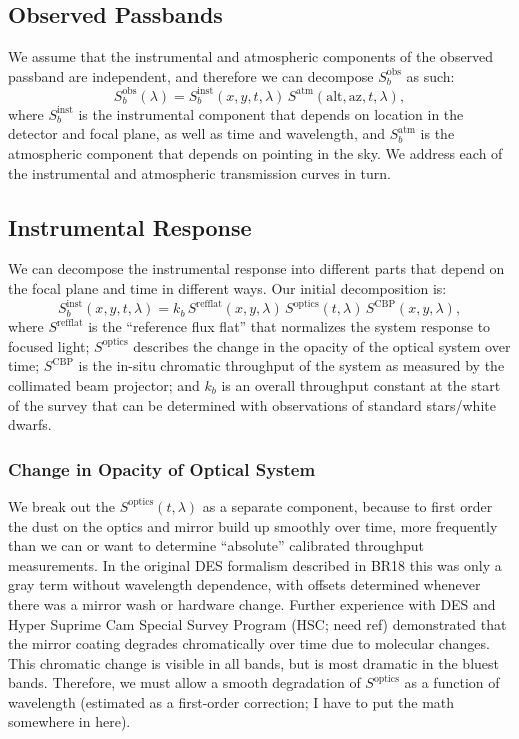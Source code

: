 \documentclass[SE,authoryear,lsstdraft,toc]{lsstdoc}
\newcommand{\Sobs}{S_b^{\mathrm{obs}}}
\begin{document}
\subsection{Observed Passbands}

We assume that the instrumental and atmospheric components of the observed
passband are independent, and therefore we can decompose $\Sobs$ as such:
%
\begin{equation}
\Sobs(\lambda) = S_b^{\mathrm{inst}}(x, y, t,
\lambda)\,S^{\mathrm{atm}}(\mathrm{alt}, \mathrm{az}, t, \lambda),
\end{equation}
%
where $S_b^{\mathrm{inst}}$ is the instrumental component that depends on
location in the detector and focal plane, as well as time and wavelength, and
$S_b^{\mathrm{atm}}$ is the atmospheric component that depends on pointing in
the sky.  We address each of the instrumental and atmospheric transmission
curves in turn.

\subsection{Instrumental Response}

We can decompose the instrumental response into different parts that depend on
the focal plane and time in different ways.  Our initial decomposition is:
%
\begin{equation}
S_b^{\mathrm{inst}}(x, y, t, \lambda) = k_b\,S^{\mathrm{refflat}}(x, y,
\lambda)\,S^{\mathrm{optics}}(t, \lambda)\,S^{\mathrm{CBP}}(x, y, \lambda),
\end{equation}
%
where $S^{\mathrm{refflat}}$ is the ``reference flux flat'' that normalizes the
system response to focused light; $S^{\mathrm{optics}}$ describes the change in
the opacity of the optical system over time; $S^{\mathrm{CBP}}$ is the
in-situ chromatic throughput of the system as measured by the collimated beam
projector; and $k_b$ is an overall throughput constant at the start of the
survey that can be determined with observations of standard stars/white dwarfs.

\subsubsection{Change in Opacity of Optical System}

We break out the $S^{\mathrm{optics}}(t, \lambda)$ as a separate component,
because to first order the dust on the optics and mirror build up smoothly over
time, more frequently than we can or want to determine ``absolute'' calibrated
throughput measurements.  In the original DES formalism described in BR18 this
was only a gray term without wavelength dependence, with offsets determined
whenever there was a mirror wash or hardware change.  Further experience with
DES and Hyper Suprime Cam Special Survey Program (HSC; need ref) demonstrated
that the mirror coating degrades chromatically over time due to molecular
changes.  This chromatic change is visible in all bands, but is most dramatic
in the bluest bands.  Therefore, we must allow a smooth degradation of
$S^{\mathrm{optics}}$ as a function of wavelength (estimated as a first-order
correction; I have to put the math somewhere in here).
\end{document}
